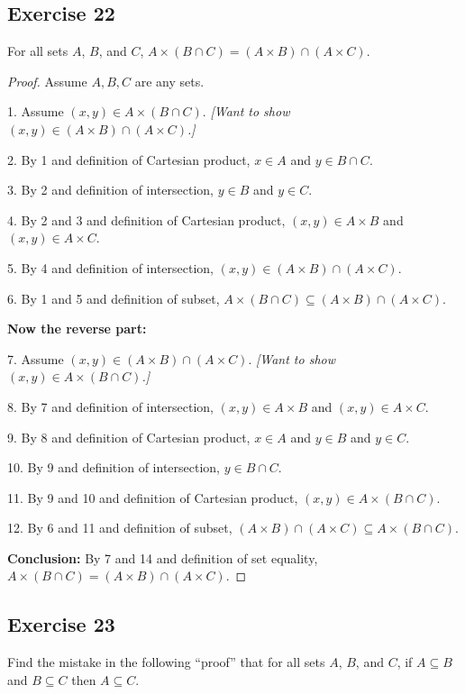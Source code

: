 \documentclass[14pt]{extarticle}
\begin{document}
\subsection{Exercise 22}
For all sets $A$, $B$, and $C$, \(A \times (B \cap C) = (A \times B) \cap (A \times C)\).

\begin{proof}
  Assume $A,B,C$ are any sets.

  1. Assume \((x, y) \in A \times (B \cap C)\). {\it [Want to show \((x, y) \in (A \times B) \cap (A \times C)\).]}

  2. By 1 and definition of Cartesian product, $x \in A$ and \(y \in B \cap C\).

  3. By 2 and definition of intersection, $y \in B$ and $y \in C$.

  4. By 2 and 3 and definition of Cartesian product, \((x, y) \in A \times B\) and \((x, y) \in A \times C\).

  5. By 4 and definition of intersection, \((x, y) \in (A \times B) \cap (A \times C)\).

  6. By 1 and 5 and definition of subset, \(A \times (B \cap C) \subseteq (A \times B) \cap (A \times C)\).

    {\bf Now the reverse part:}

  7. Assume \((x, y) \in (A \times B) \cap (A \times C)\). {\it [Want to show \((x, y) \in A \times (B \cap C)\).]}

  8. By 7 and definition of intersection, \((x,y) \in A \times B\) and \((x,y) \in A \times C\).

  9. By 8 and definition of Cartesian product, $x \in A$ and $y \in B$ and $y \in C$.

  10. By 9 and definition of intersection, \(y \in B \cap C\).

  11. By 9 and 10 and definition of Cartesian product, \((x,y) \in A \times (B \cap C)\).

  12. By 6 and 11 and definition of subset, \((A \times B) \cap (A \times C) \subseteq A \times (B \cap C)\).

    {\bf Conclusion:} By 7 and 14 and definition of set equality, \(A \times (B \cap C) = (A \times B) \cap (A \times C)\).
\end{proof}

\subsection{Exercise 23}
Find the mistake in the following “proof” that for all sets $A$, $B$, and $C$, if \(A \subseteq B\) and
\(B \subseteq C\) then \(A \subseteq C\).
\end{document}

